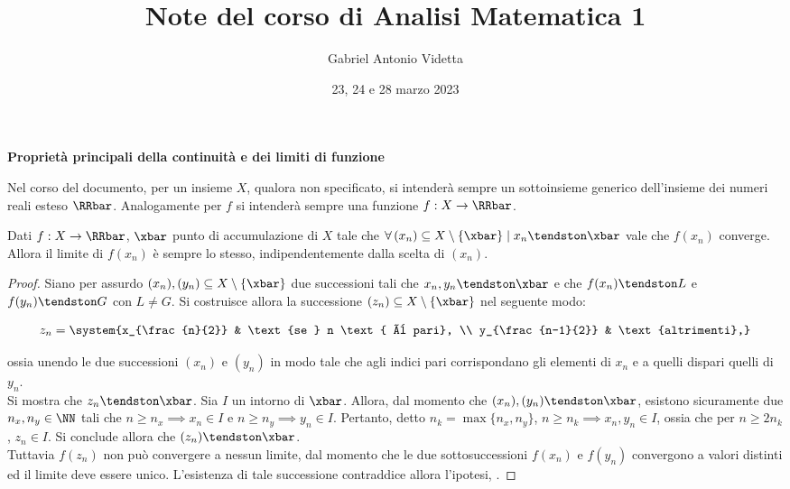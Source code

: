 \documentclass[11pt]{article}
\title{\textbf{Note del corso di Analisi Matematica 1}}
\author{Gabriel Antonio Videtta}
\date{23, 24 e 28 marzo 2023}
\begin{document}
	
	\maketitle
	
	\begin{center}
		\Large \textbf{Proprietà principali della continuità e dei limiti di funzione}
	\end{center}
	
	\begin{note} Nel corso del documento, per un insieme $X$, qualora non
		specificato, si intenderà sempre un sottoinsieme generico dell'insieme
		dei numeri reali esteso $\RRbar$. Analogamente per $f$ si intenderà
		sempre una funzione $f : X \to \RRbar$.
	\end{note}
	
	\begin{proposition}
		Dati $f : X \to \RRbar$, $\xbar$ punto di accumulazione di $X$
		tale che $\forall \, (x_n) \subseteq X \setminus \{\xbar\} \mid x_n \tendston \xbar$ vale che
		$f(x_n)$ converge. Allora il limite di $f(x_n)$ è sempre lo stesso, indipendentemente
		dalla scelta di $(x_n)$.
	\end{proposition}

	\begin{proof}
		Siano per assurdo $(x_n), (y_n) \subseteq X \setminus \{\xbar\}$ due successioni tali che
		$x_n, y_n \tendston \xbar$ e che $f(x_n) \tendston L$ e $f(y_n) \tendston G$ con $L \neq G$. Si
		costruisce allora la successione $(z_n) \subseteq X \setminus \{\xbar\}$ nel seguente modo:
		
		\[ z_n = \system{x_{\frac{n}{2}} & \text{se } n \text{ è pari}, \\ y_{\frac{n-1}{2}} & \text{altrimenti},} \]
		
		\vskip 0.05in
		
		ossia unendo le due successioni $(x_n)$ e $(y_n)$ in modo tale che agli indici pari corrispondano gli
		elementi di $x_n$ e a quelli dispari quelli di $y_n$. \\
		
		Si mostra che $z_n \tendston \xbar$. Sia $I$ un intorno di $\xbar$. Allora, dal momento che
		$(x_n), (y_n) \tendston \xbar$, esistono sicuramente due
		$n_x, n_y \in \NN$ tali che $n \geq n_x \implies x_n \in I$ e $n \geq n_y \implies y_n \in I$. Pertanto,
		detto $n_k = \max\{n_x, n_y\}$, $n \geq n_k \implies x_n, y_n \in I$, ossia che per $n \geq 2 n_k$,
		$z_n \in I$. Si conclude allora che $(z_n) \tendston \xbar$. \\
		
		Tuttavia $f(z_n)$ non può convergere a nessun limite, dal momento che le due sottosuccessioni
		$f(x_n)$ e $f(y_n)$ convergono a valori distinti ed il limite deve essere unico. L'esistenza di
		tale successione contraddice allora l'ipotesi, \Lightning.
	\end{proof}
\end{document}
